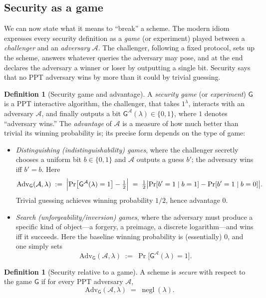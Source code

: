 \documentclass[11pt,a4paper]{article}
\theoremstyle{definition}
\newtheorem{definition}[theorem]{Definition}
\theoremstyle{remark}
\DeclareMathOperator{\negl}{negl}
\begin{document}
\subsection{Security as a game}\label{model:subsec:games}

We can now state what it means to ``break'' a scheme. The modern idiom expresses
every security definition as a \emph{game} (or experiment) played between a
\emph{challenger} and an \emph{adversary} \(\mathcal{A}\). The challenger,
following a fixed protocol, sets up the scheme, answers whatever queries the
adversary may pose, and at the end declares the adversary a winner or loser
by outputting a single bit. Security says that no PPT adversary wins by more than
it could by trivial guessing.

\begin{definition}[Security game and advantage]\label{model:def:game}
A \emph{security game} (or \emph{experiment}) \(\mathsf{G}\) is a PPT interactive
algorithm, the challenger, that takes \(1^\lambda\), interacts with an adversary
\(\mathcal{A}\), and finally outputs a bit
\(\mathsf{G}^{\mathcal{A}}(\lambda) \in \{0,1\}\), where \(1\) denotes ``adversary
wins.'' The \emph{advantage} of \(\mathcal{A}\) is a measure of how much better
than trivial its winning probability is; its precise form depends on the type of
game:
\begin{itemize}
\item \emph{Distinguishing (indistinguishability) games}, where the challenger
  secretly chooses a uniform bit \(b\in\{0,1\}\) and \(\mathcal{A}\) outputs a
  guess \(b'\); the adversary wins iff \(b'=b\). Here
  \[
    \mathrm{Adv}_{\mathsf{G}}(\mathcal{A},\lambda)
    \;:=\; \Bigl| \Pr\bigl[\mathsf{G}^{\mathcal{A}}(\lambda)=1\bigr]
                  - \tfrac{1}{2} \Bigr|
    \;=\; \tfrac12\bigl|\Pr[b'=1\mid b=1]-\Pr[b'=1\mid b=0]\bigr|.
  \]
  Trivial guessing achieves winning probability \(1/2\), hence advantage \(0\).
\item \emph{Search (unforgeability/inversion) games}, where the adversary must
  produce a specific kind of object---a forgery, a preimage, a discrete
  logarithm---and wins iff it succeeds. Here the baseline winning probability is
  (essentially) \(0\), and one simply sets
  \[
    \mathrm{Adv}_{\mathsf{G}}(\mathcal{A},\lambda)
    \;:=\; \Pr\bigl[\mathsf{G}^{\mathcal{A}}(\lambda)=1\bigr].
  \]
\end{itemize}
\end{definition}

\begin{definition}[Security relative to a game]\label{model:def:secure}
A scheme is \emph{secure} with respect to the game \(\mathsf{G}\) if for every PPT
adversary \(\mathcal{A}\),
\[
  \mathrm{Adv}_{\mathsf{G}}(\mathcal{A},\lambda) \;=\; \negl(\lambda).
\]
\end{definition}
\end{document}
